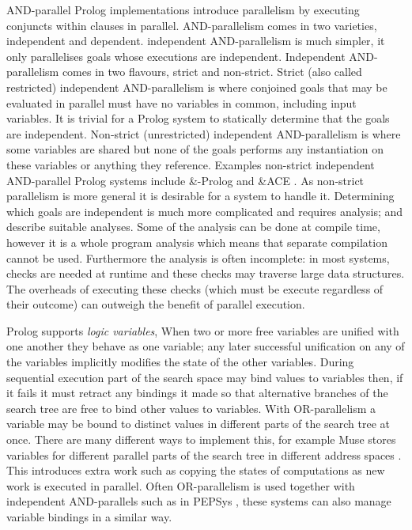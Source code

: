 AND-parallel Prolog implementations introduce parallelism by executing
conjuncts within clauses in parallel.
AND-parallelism comes in two varieties, independent and dependent.
independent AND-parallelism is much simpler, it only parallelises goals
whose executions are independent.
Independent AND-parallelism comes in two flavours, strict and non-strict.
Strict (also called restricted) independent AND-parallelism is where
conjoined goals that may be evaluated in parallel must have no variables in
common, including input variables.
It is trivial for a Prolog system to statically determine that the goals are
independent.
Non-strict (unrestricted) independent AND-parallelism is where some variables
are shared but none of the goals performs any instantiation on these variables
or anything they reference.
Examples non-strict independent AND-parallel Prolog systems include \&-Prolog
\citep{Hermenegildo:1991:and-parallel,
DBLP:journals/jlp/MuthukumarBBH99}
and \&ACE \citep{gupta:1991:ace}.
As non-strict parallelism is more general it is desirable for a system to
handle it.
Determining which goals are independent is much more complicated and
requires analysis;
\citet{DBLP:journals/tcs/GrasH09} and \citet{Hermenegildo1995} describe
suitable analyses.
Some of the analysis can be done at compile time,
however it is a whole program analysis which means that separate compilation
cannot be used.
Furthermore the analysis is often incomplete:
in most systems, checks are needed at runtime and these checks may traverse
large data structures.
The overheads of executing these checks
(which must be execute regardless of their outcome)
can outweigh the benefit of parallel execution.

Prolog supports \emph{logic variables},
When two or more free variables are unified with one another they behave as one
variable;
any later successful unification on any of the variables implicitly modifies
the state of the other variables.
During sequential execution
part of the search space may bind values to variables then,
if it fails it must retract any bindings it made so that alternative
branches of the search tree are free to bind other values to variables.
With OR-parallelism a variable may be bound to distinct values in different
parts of the search tree at once.
There are many different ways to implement this,
for example Muse stores variables for different parallel parts of the search
tree in different address spaces \citep{ali:1990:muse}.
This introduces extra work such as copying the states of computations as new
work is executed in parallel.
Often OR-parallelism is used together with independent AND-parallels
such as in PEPSys \citep{baron:1988:pepsys},
these systems can also manage variable bindings in a similar way.

